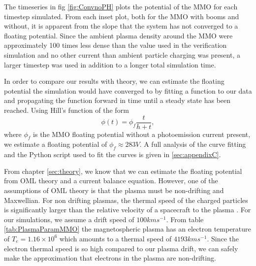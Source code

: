 The timeseries in fig \ref{fig:ConvnoPH} plots the potential of the MMO for each timestep simulated. From each inset plot, both for the MMO with booms and without, it is apparent from the slope that the system has not converged to a floating potential. Since the ambient plasma density around the MMO were approximately 100 times less dense than the value used in the verification simulation and no other current than ambient particle charging was present, a larger timestep was used in addition to a longer total simulation time. 

In order to compare our results with theory, we can estimate the floating potential the simulation would have converged to by fitting a function to our data and propagating the function forward in time until a steady state has been reached. Using Hill's function of the form 
\begin{equation*}
    \phi(t) = \phi_f \frac{t}{h + t},
\end{equation*}
where $\phi_f$ is the MMO floating potential without a photoemission current present, we estimate a floating potential of $\phi_f \approx 283 V$. A full analysis of the curve fitting and the Python script used to fit the curves is given in  \cref{sec:appendixC}.

From chapter \cref{sec:theory}, we know that we can estimate the floating potential from OML theory and a current balance equation. However, one of the assumptions of OML theory is that the plasma must be non-drifting and Maxwellian. For non drifting plasmas, the thermal speed of the charged particles is significantly larger than the relative velocity of a spacecraft to the plasma \parencite{Jacobsen2010}. For our simulations, we assume a drift speed of $100 km s^{-1}$. From table \ref{tab:PlasmaParamMMO} the magnetospheric plasma has an electron temperature of $T_e = 1.16 \times 10^6$ which amounts to a thermal speed of $4193 km s^{-1}$. Since the electron thermal speed is so high compared to our plasma drift, we can safely make the approximation that electrons in the plasma are non-drifting. 

